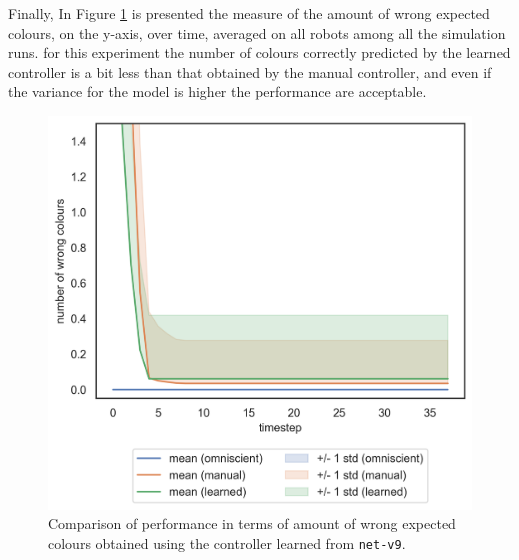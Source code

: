 Finally, In Figure \ref{fig:net-v9error} is presented the measure of the amount of 
wrong expected colours, on the y-axis, over time, averaged on all robots among 
all the simulation runs. 
for this experiment the number of colours correctly predicted by the learned 
controller is a bit less than that obtained by the manual controller, and even if the 
variance for the model is higher the performance are acceptable.
\begin{figure}[!htb]
	\centering
	\includegraphics[width=.5\textwidth]{contents/images/net-v9/colours-errors-compressed}%
	\caption[Evaluation of \texttt{net-v9} amount of wrong expected 
	colours.]{Comparison of performance in terms of amount of wrong expected 
		colours obtained using the controller learned from \texttt{net-v9}.}
	\label{fig:net-v9error}
\end{figure}

